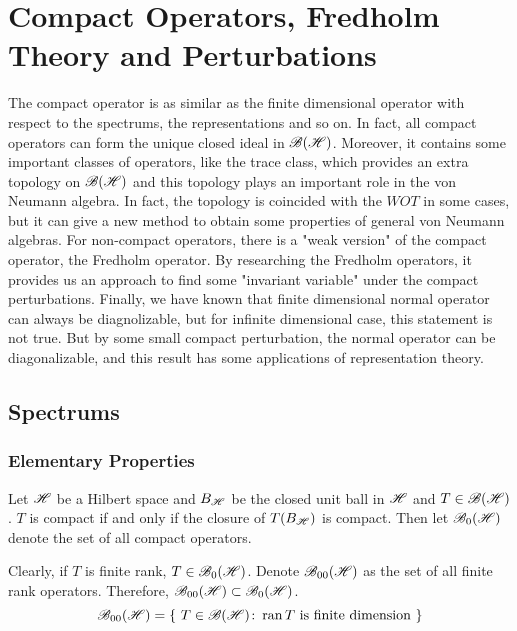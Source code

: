 \chapter{Compact Operators, Fredholm Theory and Perturbations}

The compact operator is as similar as the finite dimensional operator with respect to the spectrums, the representations and so on. In fact, all compact operators can form the unique closed ideal in $\mathscr{B(H)}$. Moreover, it contains some important classes of operators, like the trace class, which provides an extra topology on $\mathscr{B(H)}$ and this topology plays an important role in the von Neumann algebra. In fact, the topology is coincided with the $WOT$ in some cases, but it can give a new method to obtain some properties of general von Neumann algebras. For non-compact operators, there is a "weak version" of the compact operator, the Fredholm operator. By researching the Fredholm operators, it provides us an approach to find some "invariant variable" under the compact perturbations. Finally, we have known that finite dimensional normal operator can always be diagnolizable, but for infinite dimensional case, this statement is not true. But by some small compact perturbation, the normal operator can be diagonalizable, and this result has some applications of representation theory. 

\section{Spectrums}

\subsection{Elementary Properties}

\begin{defn}
	Let $\mathscr{H}$ be a Hilbert space and $B_{\mathscr{H}}$ be the closed unit ball in $\mathscr{H}$ and $T \in \mathscr{B(H)}$. $T$ is compact if and only if the closure of $T(B_{\mathscr{H}})$ is compact. Then let $\mathscr{B}_{0}\mathscr{(H)}$ denote the set of all compact operators.
\end{defn}
\begin{rem}
	Clearly, if $T$ is finite rank, $T \in \mathscr{B}_{0}\mathscr{(H)}$. Denote $\mathscr{B}_{00}\mathscr{(H)}$ as the set of all finite rank operators. Therefore, $\mathscr{B}_{00}\mathscr{(H)} \subset \mathscr{B}_{0}\mathscr{(H)}$.
	\begin{equation*}
		\mathscr{B}_{00}\mathscr{(H)} = \{~T \in \mathscr{B(H)} \colon \operatorname{ran}{T} \text{ is finite dimension}~\}
	\end{equation*}
\end{rem}

